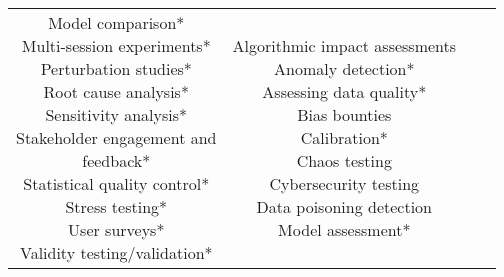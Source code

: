 \documentclass[fleqn]{article}
\begin{document}
\begin{landscape}
\begin{table}[H]
\begin{tabular}{|c|c|c|c|}
{			\textbullet\hspace{3pt} Model comparison*\\  	
			\textbullet\hspace{3pt} Multi-session experiments*\\  	
			\textbullet\hspace{3pt} Perturbation studies*\\  		
			\textbullet\hspace{3pt} Root cause analysis*\\  	
			\textbullet\hspace{3pt} Sensitivity analysis*\\  	
			\textbullet\hspace{3pt} Stakeholder engagement and\\\hspace{10pt}feedback*\\  	
			\textbullet\hspace{3pt} Statistical quality control*\\  	
			\textbullet\hspace{3pt} Stress testing*\\  		
			\textbullet\hspace{3pt} User surveys*\\  	
			\textbullet\hspace{3pt} Validity testing/validation*\\  
		}
		& \makecell[l]{
			\textbullet\hspace{3pt} Algorithmic impact assessments \\ 
			\textbullet\hspace{3pt} Anomaly detection*\\ 
			\textbullet\hspace{3pt} Assessing data quality*\\ 
			\textbullet\hspace{3pt} Bias bounties \\ 
			\textbullet\hspace{3pt} Calibration*\\ 
			\textbullet\hspace{3pt} Chaos testing \\ 
			\textbullet\hspace{3pt} Cybersecurity testing \\ 
			\textbullet\hspace{3pt} Data poisoning detection \\ 
			\textbullet\hspace{3pt} Model assessment*\\ 
}
\end{tabular}
\end{table}
\end{landscape}
\end{document}
